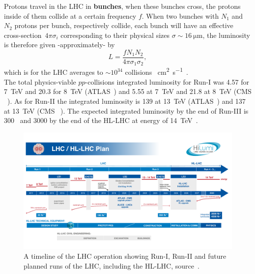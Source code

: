 Protons travel in the LHC in \textbf{bunches}, when these bunches cross, the protons inside of them collide at a certain frequency $f$.  When two bunches with $N_1$ and $N_2$ protons per bunch, respectively collide, each bunch will have an effective cross-section~$4 \pi \sigma_i$ corresponding to their physical sizes $\sigma \sim \SI{16}{\micro \meter}$, the luminosity is therefore given -approximately- by 
\begin{equation}
	L = \frac{f N_1 N_2}{4 \pi  \sigma_1 \sigma_2},
\end{equation}
which is for the LHC averages to  $\sim 10^{34}$ collisions \si{\per \centi\metre\squared \per \second}~\cite{closer,lhcpreformance}.  \\ The total physics-viable $pp$-collisions  integrated luminosity for Run-I was \SI{4.57}{\infb} for \SI{7}{\tera\electronvolt} and \SI{20.3}{\infb} for \SI{8}{\tera\electronvolt} (ATLAS~\cite{atlaslumi1}) and  \SI{5.55}{\infb} at \SI{7}{\tera\electronvolt} and \SI{21.8}{\infb} at \SI{8}{\tera\electronvolt} (CMS ~\cite{cmslumi}). As for Run-II the integrated luminosity is \SI{139}{\infb} at \SI{13}{\tera\electronvolt } (ATLAS~\cite{atlaslumi2})  and \SI{137}{\infb} at \SI{13}{\tera\electronvolt } (CMS ~\cite{cmslumi}). The expected integrated luminosity by the end of Run-III is  \SI{300}{\infb}~\cite{Fartoukh:2790409} and \SI{3000}{\infb} by the end of the HL-LHC at energy of \SI{14}{\tera\electronvolt }~\cite{Apollinari:2015bam}. 
\begin{figure}[htbp!]
	\centering
	\includegraphics[width=\textwidth]{figures/HL-LHC-plan-2021-1}
	\caption{ A timeline of the LHC operation showing Run-I, Run-II and future planned runs of the LHC, including the HL-LHC, source~\cite{lhckomission}. 
	}
	\label{fig:lhcplan}
\end{figure}
